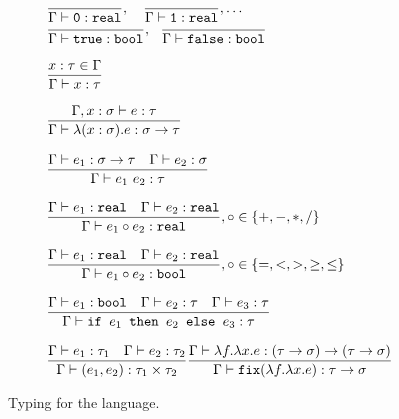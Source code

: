 \begin{figure}
\[
\begin{array}{lr}
\dfrac{}{\Gamma \vdash \texttt{0}: \texttt{real}}, \quad \dfrac{}{\Gamma \vdash \texttt{1}: \texttt{real}}, \ldots \\
\dfrac{}{\Gamma \vdash \texttt{true} : \texttt{bool}}, \ \ \dfrac{}{\Gamma \vdash \texttt{false} : \texttt{bool}} \\ \\
\dfrac{x : \tau \in \Gamma}{\Gamma \vdash x : \tau } \\ \\
\dfrac{\Gamma, x : \sigma \vdash e : \tau}{\Gamma \vdash \lambda (x : \sigma).e : \sigma \rightarrow \tau } \\ \\ 
\dfrac{\Gamma \vdash e_1: \sigma \rightarrow \tau \ \ \ \Gamma \vdash e_2 : \sigma}{\Gamma \vdash e_1 \ e_2 : \tau} \\ \\ 
\dfrac{\Gamma \vdash e_1 : \texttt{real} \ \ \ \Gamma \vdash e_2 : \texttt{real}}{\Gamma \vdash e_1 \circ e_2 : \texttt{real}}
, \circ \in \{+,-,*,/\} \\ \\ 
\dfrac{\Gamma \vdash e_1 : \texttt{real} \ \ \ \Gamma \vdash e_2 : \texttt{real}}{\Gamma \vdash e_1 \circ e_2 : \texttt{bool}}
, \circ \in \{=, <, >, \geq, \leq\} \\ \\ 
\dfrac{\Gamma \vdash e_1 : \texttt{bool} \ \ \ \Gamma \vdash e_2 : \tau \ \ \ \Gamma \vdash e_3 : \tau}
{\Gamma \vdash \ifelse{e_1}{e_2}{e_3} : \tau} \\ \\ 
\dfrac{\Gamma \vdash e_1 : \tau_1 \ \ \ \Gamma \vdash e_2: \tau_2}{\Gamma \vdash (e_1, e_2) : \tau_1 \times \tau_2}
\dfrac{\Gamma \vdash \lambda f. \lambda x.e : (\tau \rightarrow \sigma) \rightarrow (\tau \rightarrow \sigma)}
{\Gamma \vdash \texttt{fix}(\lambda f. \lambda x.e) : \tau \rightarrow \sigma} 
\end{array}
\]
\caption{Typing for the language.}
\label{fig:typing}
\end{figure}

